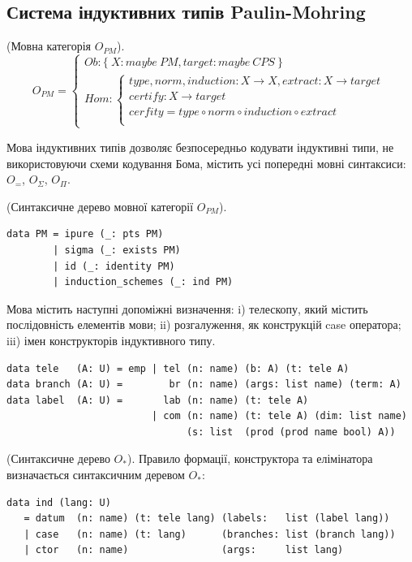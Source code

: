 \newpage
\subsection{Система індуктивних типів Paulin-Mohring}

\begin{definition} (Мовна категорія $O_{PM}$).
\begin{equation}
O_{PM} =
\begin{cases}
Ob: \{\ X: maybe\ PM, target: maybe\ CPS\ \} \\
Hom: \begin{cases}
type,norm,induction: X \rightarrow X, extract: X \rightarrow target \\
certify : X \rightarrow target \\
cerfity = type \circ norm \circ induction \circ extract \\
\end{cases}
\end{cases}
\end{equation}
\end{definition}

Мова індуктивних типів дозволяє безпосередньо кодувати індуктивні типи,
не використовуючи схеми кодування Бома, містить усі попередні мовні синтаксиси:
$O_=$, $O_\Sigma$, $O_\Pi$.

\begin{definition} (Синтаксичне дерево мовної категорії $O_{PM}$).
\begin{lstlisting}
data PM = ipure (_: pts PM)
        | sigma (_: exists PM)
        | id (_: identity PM)
        | induction_schemes (_: ind PM)
\end{lstlisting}
\end{definition}

Мова містить наступні допоміжні визначення: i) телескопу,
який містить послідовність елементів мови; ii) розгалуження,
як конструкцій case оператора; iii) імен конструкторів індуктивного типу.

\begin{lstlisting}
data tele   (A: U) = emp | tel (n: name) (b: A) (t: tele A)
data branch (A: U) =        br (n: name) (args: list name) (term: A)
data label  (A: U) =       lab (n: name) (t: tele A)
                         | com (n: name) (t: tele A) (dim: list name)
                               (s: list  (prod (prod name bool) A))
\end{lstlisting}

\begin{definition} (Синтаксичне дерево $O_{*}$).
Правило формації, конструктора та елімінатора визначається синтаксичним деревом $O_{*}$:
\begin{lstlisting}
data ind (lang: U)
   = datum  (n: name) (t: tele lang) (labels:   list (label lang))
   | case   (n: name) (t: lang)      (branches: list (branch lang))
   | ctor   (n: name)                (args:     list lang)
\end{lstlisting}
\end{definition}

